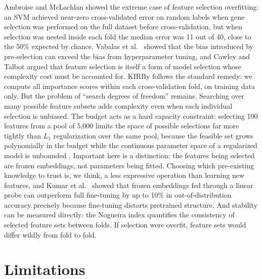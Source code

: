 Ambroise and McLachlan \citep{Ambroise2002} showed the extreme case of feature selection overfitting: an SVM achieved near-zero cross-validated error on random labels when gene selection was performed on the full dataset before cross-validation, but when selection was nested inside each fold the median error was 11 out of 40, close to the 50\% expected by chance. Vabalas et al.\ \citep{Vabalas2019} showed that the bias introduced by pre-selection can exceed the bias from hyperparameter tuning, and Cawley and Talbot \citep{Cawley2010} argued that feature selection is itself a form of model selection whose complexity cost must be accounted for. KIRBy follows the standard remedy: we compute all importance scores within each cross-validation fold, on training data only. But the problem of ``search degrees of freedom'' \citep{Tibshirani2015} remains. Searching over many possible feature subsets adds complexity even when each individual selection is unbiased. The budget acts as a hard capacity constraint: selecting 100 features from a pool of 5,000 limits the space of possible selections far more tightly than $L_1$ regularization over the same pool, because the feasible set grows polynomially in the budget while the continuous parameter space of a regularized model is unbounded \citep{Ng2004}. Important here is a distinction: the features being selected are frozen embeddings, not parameters being fitted. Choosing which pre-existing knowledge to trust is, we think, a less expressive operation than learning new features, and Kumar et al.\ \citep{Kumar2022} showed that frozen embeddings fed through a linear probe can outperform full fine-tuning by up to 10\% in out-of-distribution accuracy precisely because fine-tuning distorts pretrained structure. And stability can be measured directly: the Nogueira index \citep{Nogueira2018} quantifies the consistency of selected feature sets between folds. If selection were overfit, feature sets would differ wildly from fold to fold.

\section{Limitations}

